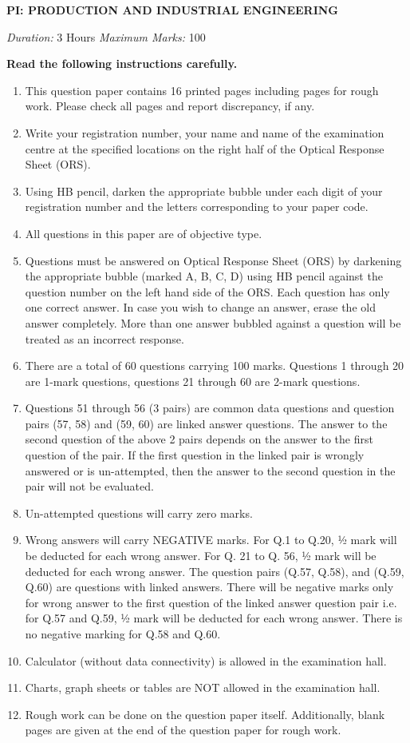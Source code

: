 \documentclass[a4paper,12pt]{article}
\begin{document}
{\centering
  \textbf{\normalsize PI: PRODUCTION AND INDUSTRIAL ENGINEERING}

  \textit{\large Duration:} 3 Hours \hfill \textit{\large Maximum Marks:} 100
}

\textbf{Read the following instructions carefully.}
\begin{enumerate}[leftmargin=0.5cm,label=\arabic*.]
\item This question paper contains 16 printed pages including pages for rough work. Please check all pages and report discrepancy, if any.
\item Write your registration number, your name and name of the examination centre at the specified locations on the right half of the Optical Response Sheet (ORS).
\item Using HB pencil, darken the appropriate bubble under each digit of your registration number and the letters corresponding to your paper code.
\item All questions in this paper are of objective type.
\item Questions must be answered on Optical Response Sheet (ORS) by darkening the appropriate bubble (marked A, B, C, D) using HB pencil against the question number on the left hand side of the ORS. Each question has only one correct answer. In case you wish to change an answer, erase the old answer completely. More than one answer bubbled against a question will be treated as an incorrect response.
\item There are a total of 60 questions carrying 100 marks. Questions 1 through 20 are 1-mark questions, questions 21 through 60 are 2-mark questions.
\item Questions 51 through 56 (3 pairs) are common data questions and question pairs (57, 58) and (59, 60) are linked answer questions. The answer to the second question of the above 2 pairs depends on the answer to the first question of the pair. If the first question in the linked pair is wrongly answered or is un-attempted, then the answer to the second question in the pair will not be evaluated.
\item Un-attempted questions will carry zero marks.
\item Wrong answers will carry NEGATIVE marks. For Q.1 to Q.20, ½ mark will be deducted for each wrong answer. For Q. 21 to Q. 56, ½ mark will be deducted for each wrong answer. The question pairs (Q.57, Q.58), and (Q.59, Q.60) are questions with linked answers. There will be negative marks only for wrong answer to the first question of the linked answer question pair i.e. for Q.57 and Q.59, ½ mark will be deducted for each wrong answer. There is no negative marking for Q.58 and Q.60.
\item Calculator (without data connectivity) is allowed in the examination hall.
\item Charts, graph sheets or tables are NOT allowed in the examination hall.
\item Rough work can be done on the question paper itself. Additionally, blank pages are given at the end of the question paper for rough work.
\end{enumerate}
\end{document}
